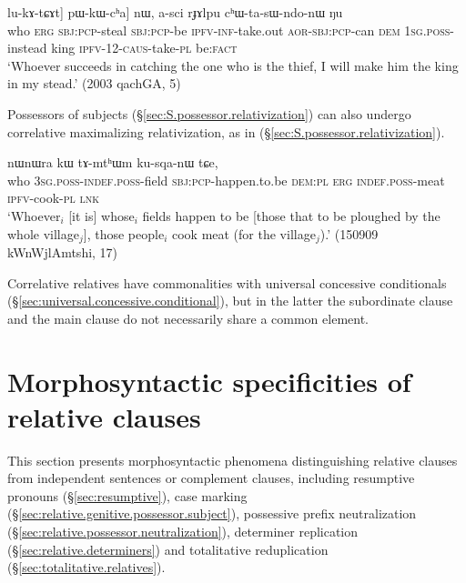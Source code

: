 \begin{exe}
\ex \label{ex:CW.kW.kWmWrkW}
\gll  [[\textbf{ɕɯ} kɯ [kɯ-mɯrkɯ kɯ-ŋu] lu-kɤ-tɕɤt] pɯ-kɯ-cʰa] nɯ, a-sci rɟɤlpu cʰɯ-ta-sɯ-ndo-nɯ ŋu \\
who \textsc{erg} \textsc{sbj}:\textsc{pcp}-steal  \textsc{sbj}:\textsc{pcp}-be \textsc{ipfv}-\textsc{inf}-take.out \textsc{aor}-\textsc{sbj}:\textsc{pcp}-can \textsc{dem} \textsc{1sg}.\textsc{poss}-instead king \textsc{ipfv}-1\fl{}2-\textsc{caus}-take-\textsc{pl} be:\textsc{fact} \\
\glt `Whoever succeeds in catching the one who is the thief, I will make him the king in my stead.' (2003 qachGA, 5)
\end{exe}

Possessors of subjects (§\ref{sec:S.possessor.relativization}) can also undergo correlative maximalizing relativization, as in (§\ref{sec:S.possessor.relativization}).

\begin{exe}
\ex \label{ex:WtWji.kWnAtWG}
 nɯnɯra kɯ tɤ-mtʰɯm ku-sqa-nɯ tɕe, \\
who \textsc{3sg}.\textsc{poss}-\textsc{indef}.\textsc{poss}-field \textsc{sbj}:\textsc{pcp}-happen.to.be \textsc{dem}:\textsc{pl} \textsc{erg} \textsc{indef}.\textsc{poss}-meat \textsc{ipfv}-cook-\textsc{pl} \textsc{lnk} \\
\glt `Whoever$_i$ [it is] whose$_i$ fields happen to be [those that to be ploughed by the whole village$_j$], 
those people$_i$ cook meat (for the village$_j$).' (150909 kWnWjlAmtshi, 17)
\end{exe}

Correlative relatives have commonalities with universal concessive conditionals (§\ref{sec:universal.concessive.conditional}), but in the latter the subordinate clause and the main clause do not necessarily share a common element.

\section{Morphosyntactic specificities of relative clauses} \label{sec:relative.morphosyntactic.specificities}
This section presents morphosyntactic phenomena distinguishing relative clauses from independent sentences or complement clauses, including resumptive pronouns (§\ref{sec:resumptive}), case marking (§\ref{sec:relative.genitive.possessor.subject}), possessive prefix neutralization (§\ref{sec:relative.possessor.neutralization}), determiner replication (§\ref{sec:relative.determiners}) and totalitative reduplication (§\ref{sec:totalitative.relatives}).

